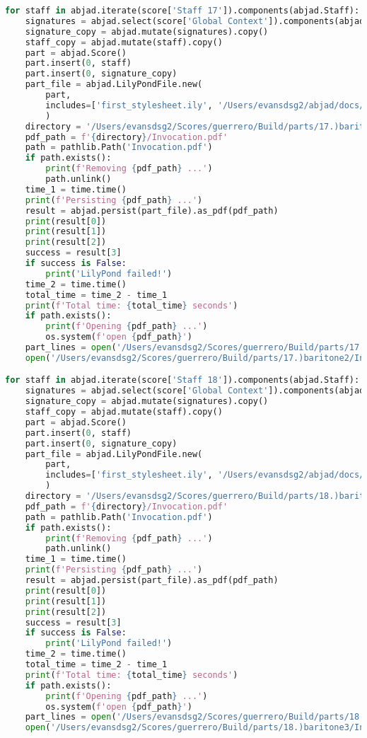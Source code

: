 \begin{lstlisting}[language=Python, caption=Invocation Source Code]
for staff in abjad.iterate(score['Staff 17']).components(abjad.Staff):
    signatures = abjad.select(score['Global Context']).components(abjad.Staff)
    signature_copy = abjad.mutate(signatures).copy()
    staff_copy = abjad.mutate(staff).copy()
    part = abjad.Score()
    part.insert(0, staff)
    part.insert(0, signature_copy)
    part_file = abjad.LilyPondFile.new(
        part,
        includes=['first_stylesheet.ily', '/Users/evansdsg2/abjad/docs/source/_stylesheets/abjad.ily'],
        )
    directory = '/Users/evansdsg2/Scores/guerrero/Build/parts/17.)baritone2'
    pdf_path = f'{directory}/Invocation.pdf'
    path = pathlib.Path('Invocation.pdf')
    if path.exists():
        print(f'Removing {pdf_path} ...')
        path.unlink()
    time_1 = time.time()
    print(f'Persisting {pdf_path} ...')
    result = abjad.persist(part_file).as_pdf(pdf_path)
    print(result[0])
    print(result[1])
    print(result[2])
    success = result[3]
    if success is False:
        print('LilyPond failed!')
    time_2 = time.time()
    total_time = time_2 - time_1
    print(f'Total time: {total_time} seconds')
    if path.exists():
        print(f'Opening {pdf_path} ...')
        os.system(f'open {pdf_path}')
    part_lines = open('/Users/evansdsg2/Scores/guerrero/Build/parts/17.)baritone2/Invocation.ly').readlines()
    open('/Users/evansdsg2/Scores/guerrero/Build/parts/17.)baritone2/Invocation.ly', 'w').writelines(part_lines[15:-1])

for staff in abjad.iterate(score['Staff 18']).components(abjad.Staff):
    signatures = abjad.select(score['Global Context']).components(abjad.Staff)
    signature_copy = abjad.mutate(signatures).copy()
    staff_copy = abjad.mutate(staff).copy()
    part = abjad.Score()
    part.insert(0, staff)
    part.insert(0, signature_copy)
    part_file = abjad.LilyPondFile.new(
        part,
        includes=['first_stylesheet.ily', '/Users/evansdsg2/abjad/docs/source/_stylesheets/abjad.ily'],
        )
    directory = '/Users/evansdsg2/Scores/guerrero/Build/parts/18.)baritone3'
    pdf_path = f'{directory}/Invocation.pdf'
    path = pathlib.Path('Invocation.pdf')
    if path.exists():
        print(f'Removing {pdf_path} ...')
        path.unlink()
    time_1 = time.time()
    print(f'Persisting {pdf_path} ...')
    result = abjad.persist(part_file).as_pdf(pdf_path)
    print(result[0])
    print(result[1])
    print(result[2])
    success = result[3]
    if success is False:
        print('LilyPond failed!')
    time_2 = time.time()
    total_time = time_2 - time_1
    print(f'Total time: {total_time} seconds')
    if path.exists():
        print(f'Opening {pdf_path} ...')
        os.system(f'open {pdf_path}')
    part_lines = open('/Users/evansdsg2/Scores/guerrero/Build/parts/18.)baritone3/Invocation.ly').readlines()
    open('/Users/evansdsg2/Scores/guerrero/Build/parts/18.)baritone3/Invocation.ly', 'w').writelines(part_lines[15:-1])


\end{lstlisting}
